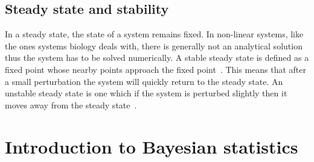  
\subsection{Steady state and stability}

In a steady state, the state of a system remains fixed. In non-linear systems, like the ones systems biology deals with, there is generally not an analytical solution thus the system has to be solved numerically. A stable steady state is defined as a fixed point whose nearby points approach the fixed point~\autocite{kaplan:1959}. This means that after a small perturbation the system will quickly return to the steady state. An unstable steady state is one which if the system is perturbed slightly then it moves away from the steady state~\autocite{konopka:2007}.    
 
\section{Introduction to Bayesian statistics}